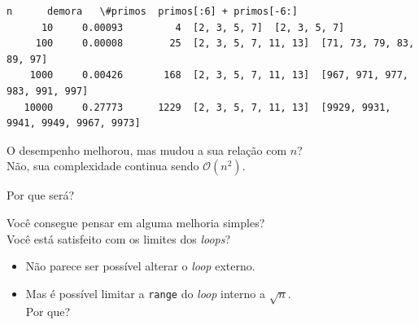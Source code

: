 \documentclass[11pt,a4paper]{article}
\providecommand{\tightlist}{%
      \setlength{\itemsep}{0pt}\setlength{\parskip}{0pt}}
\begin{document}
\pagebreak

    \begin{Verbatim}[commandchars=\\\{\}]
       n      demora   \#primos  primos[:6] + primos[-6:]
      10     0.00093         4  [2, 3, 5, 7]  [2, 3, 5, 7]
     100     0.00008        25  [2, 3, 5, 7, 11, 13]  [71, 73, 79, 83, 89, 97]
    1000     0.00426       168  [2, 3, 5, 7, 11, 13]  [967, 971, 977, 983, 991, 997]
   10000     0.27773      1229  [2, 3, 5, 7, 11, 13]  [9929, 9931, 9941, 9949, 9967, 9973]

    \end{Verbatim}

    O desempenho melhorou, mas mudou a sua relação com \(n\)?\\
Não, sua complexidade continua sendo \(\mathcal{O}(n^2)\).

Por que será?

    Você consegue pensar em alguma melhoria simples?\\
Você está satisfeito com os limites dos \emph{loops}?

    \begin{itemize}
\tightlist
\item
  Não parece ser possível alterar o \emph{loop} externo.
\item
  Mas é possível limitar a \texttt{range} do \emph{loop} interno a
  \(\sqrt{n}\).\\
  Por que?
\end{itemize}
\end{document}
